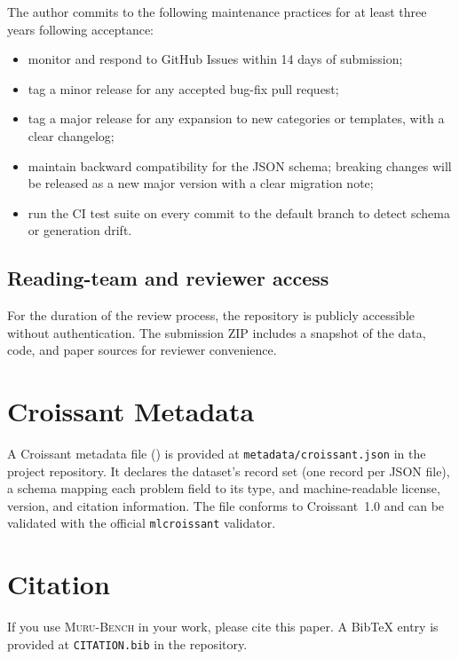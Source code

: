 \documentclass{article}
\newcommand{\muru}{\textsc{Muru-Bench}}
\begin{document}
The author commits to the following maintenance practices for at least three years following acceptance:
\begin{itemize}[leftmargin=*,itemsep=2pt]
    \item monitor and respond to GitHub Issues within 14 days of submission;
    \item tag a minor release for any accepted bug-fix pull request;
    \item tag a major release for any expansion to new categories or templates, with a clear changelog;
    \item maintain backward compatibility for the JSON schema; breaking changes will be released as a new major version with a clear migration note;
    \item run the CI test suite on every commit to the default branch to detect schema or generation drift.
\end{itemize}

\subsection*{Reading-team and reviewer access}

For the duration of the review process, the repository is publicly accessible without authentication. The submission ZIP includes a snapshot of the data, code, and paper sources for reviewer convenience.


\section{Croissant Metadata}
\label{app:croissant}

A Croissant metadata file (\citealp{croissant2024}) is provided at \texttt{metadata/croissant.json} in the project repository. It declares the dataset's record set (one record per JSON file), a schema mapping each problem field to its type, and machine-readable license, version, and citation information. The file conforms to Croissant~1.0 and can be validated with the official \texttt{mlcroissant} validator.


\section{Citation}
\label{app:citation}

If you use \muru{} in your work, please cite this paper. A BibTeX entry is provided at \texttt{CITATION.bib} in the repository.
\end{document}
